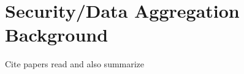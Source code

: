 \chapter{Security/Data Aggregation Background} 
\label{cha:Security/Data Aggregation Background}

Cite papers read and also summarize

\cite{wang2001energy}
\cite{ettus1998system}

